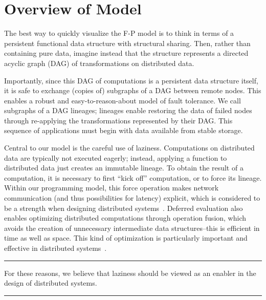 \documentclass[preprint]{sigplanconf}
\theoremstyle{definition}
\theoremstyle{definition}
\begin{document}



\section{Overview of Model}

The best way to quickly visualize the F-P model is to think in terms of a
persistent functional data structure with structural sharing. Then, rather
than containing pure data, imagine instead that the structure represents a
directed acyclic graph (DAG) of transformations on distributed data.

Importantly, since this DAG of computations is a persistent data structure
itself, it is safe to exchange (copies of) subgraphs of a DAG between remote
nodes. This enables a robust and easy-to-reason-about model of fault
tolerance. We call subgraphs of a DAG lineages; lineages enable restoring the
data of failed nodes through re-applying the transformations represented by
their DAG. This sequence of applications must begin with data available from
stable storage.

Central to our model is the careful use of laziness. Computations on
distributed data are typically not executed eagerly; instead, applying a
function to distributed data just creates an immutable lineage. To obtain the
result of a computation, it is necessary to first ``kick off'' computation, or
to force its lineage. Within our programming model, this force
operation makes network communication (and thus
possibilities for latency) explicit, which is considered to be a strength when
designing distributed systems~\cite{ANoteDistComp}. Deferred evaluation also
enables optimizing distributed computations through operation fusion, which
avoids the creation of unnecessary intermediate data structures--this is
efficient in time as well as space. This kind of optimization is particularly
important and effective in distributed systems~\cite{FlumeJava}.

\vspace{-3mm}
\begin{center}\noindent\rule{8cm}{0.4pt}\end{center}
\begin{displayquote}
For these reasons, we believe that laziness should be viewed as an enabler in
the design of distributed systems.
\end{displayquote}
\vspace{-4mm}
\begin{center}\noindent\rule{8cm}{0.4pt}\end{center}
\vspace{1mm}
\end{document}
